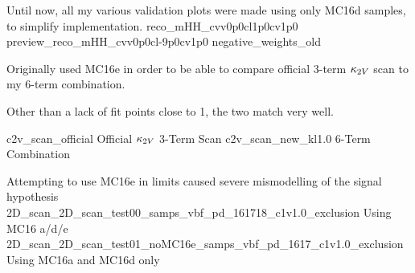 {
    Until now, all my various validation plots were made using only MC16d samples, to simplify implementation.
}
{reco_mHH_cvv0p0cl1p0cv1p0}
{preview_reco_mHH_cvv0p0cl-9p0cv1p0}
{negative_weights_old}



{
    Originally used MC16e in order to be able to compare official 3-term $\kappa_{2V}$ scan to my 6-term combination.
    
    Other than a lack of fit points close to 1, the two match very well.
}
{c2v_scan_official}
{Official $\kappa_{2V}$ 3-Term Scan}
{c2v_scan_new_kl1.0}
{6-Term Combination}

{Attempting to use MC16e in limits caused severe mismodelling of the signal hypothesis}
{2D_scan_2D_scan_test00_samps_vbf_pd_161718_c1v1.0_exclusion}
{Using MC16 a/d/e}
{2D_scan_2D_scan_test01_noMC16e_samps_vbf_pd_1617_c1v1.0_exclusion}
{Using MC16a and MC16d only}
